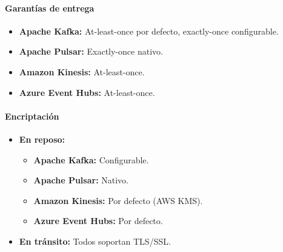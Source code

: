 \paragraph{Garantías de entrega}
\begin{itemize}
    \item \textbf{Apache Kafka:} At-least-once por defecto, exactly-once configurable.
    \item \textbf{Apache Pulsar:} Exactly-once nativo.
    \item \textbf{Amazon Kinesis:} At-least-once.
    \item \textbf{Azure Event Hubs:} At-least-once.
\end{itemize}

\paragraph{Encriptación}
\begin{itemize}
    \item \textbf{En reposo:}
    \begin{itemize}
        \item \textbf{Apache Kafka:} Configurable.
        \item \textbf{Apache Pulsar:} Nativo.
        \item \textbf{Amazon Kinesis:} Por defecto (AWS KMS).
        \item \textbf{Azure Event Hubs:} Por defecto.
    \end{itemize}
    \item \textbf{En tránsito:} Todos soportan TLS/SSL.
\end{itemize}

